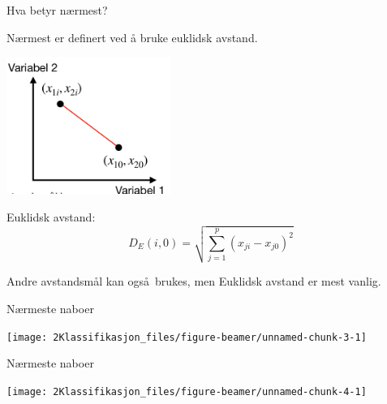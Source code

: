 \documentclass[10pt,ignorenonframetext,]{beamer}
\begin{document}
\begin{frame}

\begin{block}{Hva betyr nærmest?}

\vspace{2mm}

Nærmest er definert ved å bruke euklidsk avstand.

\centering

\includegraphics[width=0.4\textwidth,height=\textheight]{avstand.png}

\flushleft

Euklidsk avstand: \[D_E(i,0)=\sqrt{\sum_{j=1}^p (x_{ji}-x_{j0})^2 }\]

Andre avstandsm\aa l kan ogs\aa  ~brukes, men Euklidsk avstand er mest
vanlig.

\end{block}

\end{frame}

\begin{frame}

\begin{block}{N\ae rmeste naboer}

\vspace{5mm}

\begin{center}\texttt{[image: 2Klassifikasjon\_files/figure-beamer/unnamed-chunk-3-1]} \end{center}

\end{block}

\end{frame}

\begin{frame}

\begin{block}{N\ae rmeste naboer}

\vspace{5mm}

\begin{center}\texttt{[image: 2Klassifikasjon\_files/figure-beamer/unnamed-chunk-4-1]} \end{center}

\end{block}

\end{frame}
\end{document}
